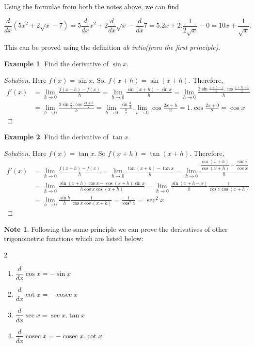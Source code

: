 \documentclass[../../main.tex]{subfiles}
\DeclareMathOperator{\cosec}{cosec}
\theoremstyle{definition}
\newtheorem{example}{Example}[section]
\newtheorem*{note}{Note}
\newenvironment{solution}
    {\begin{proof}[Solution]}
    {\end{proof}}
\begin{document}
Using the formulae from both the notes above, we can find 

\[
\dfrac{d}{dx}(5x^2+2\sqrt{x}-7)=5\dfrac{d}{dx}x^2+2\dfrac{d}{dx}\sqrt{x}-\dfrac{d}{dx}7 = 5.2x+2.\frac{1}{2\sqrt{x}}-0 = 10x+\frac{1}{\sqrt{x}}.
\]

This can be proved using the definition \emph{ab intio}\textit{(from the first principle)}.

\begin{example}
Find the derivative of $\sin x$.
\end{example}

\begin{solution}
Here $f(x)=\sin{x}$. So, $f(x+h)=\sin{(x+h)}$. Therefore,
\begin{align*}
f'(x) &= \lim_{h \rightarrow 0} \frac {f(x+h)-f(x)}{h} = \lim_{h \rightarrow 0} \frac {\sin{(x+h)}-\sin{x}}{h} = \lim_{h \rightarrow 0} \frac {2\sin{\frac{x+h-x}{2}}.\cos\frac{x+h+x}{2}}{h} \\
&= \lim_{h \rightarrow 0} \frac {2\sin{\frac{h}{2}}.\cos\frac{2x+h}{2}}{h} = \lim_{h \rightarrow 0} \frac {\sin{\frac{h}{2}}}{\frac{h}{2}}.\lim_{h \rightarrow 0} \cos{\frac{2x+h}{2}} = 1.\cos{\frac{2x+0}{2}} = \cos x
\end{align*}
\end{solution}

\begin{example}
Find the derivative of $\tan {x}$.    
\end{example}

\begin{solution}
Here $f(x)=\tan {x}$. So $f(x+h)=\tan{(x+h)}$. Therefore,
\begin{align*}
f'(x) &= \lim_{h \rightarrow 0} \frac {f(x+h)-f(x)}{h} =
 \lim_{h \rightarrow 0} \frac {\tan (x+h)-\tan x}{h} = \lim_{h \rightarrow 0} \frac {\dfrac{\sin{(x+h)}}{\cos{(x+h)}}-\dfrac{\sin{x}}{\cos{x}}}{h} \\
 &= \lim_{h \rightarrow 0} \frac {\sin{(x+h)}\cos{x}-\cos{(x+h)}\sin{x}}{h\cos{x}\cos{(x+h)}} = \lim_{h \rightarrow 0} \frac {\sin{(x+h-x)}}{h}\frac{1}{\cos{x}\cos{(x+h)}} \\ 
 &= \lim_{h \rightarrow 0} \frac {\sin{h}}{h}\frac{1}{\cos{x}\cos{(x+h)}} = \frac{1}{\cos^2{x}} = \sec^2x
\end{align*}
\end{solution}

\begin{note}
Following the same principle we can prove the derivatives of other trigonometric functions which are listed below:
\begin{multicols}{2}
\begin{enumerate}
    \item $\dfrac{d}{dx}\cos{x} = -\sin{x}$
    \item $\dfrac{d}{dx}\cot{x}=-\cosec x$
    \item $\dfrac{d}{dx}\sec x=\sec x.\tan x$
    \item $\dfrac{d}{dx}\cosec x=-\cosec x.\cot{x}$
\end{enumerate}
\end{multicols}    
\end{note}
\end{document}
